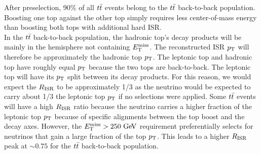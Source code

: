 \indent  After preselection, 90\% of all $t\bar{t}$ events belong to the $t\bar{t}$ back-to-back population.  Boosting one top against the other top simply requires less center-of-mass energy than boosting both tops with additional hard ISR.  \\

\indent In the $t\bar{t}$ back-to-back population, the hadronic top's decay products will be mainly in the hemisphere not containing $E_{\mathrm{T}}^{\mathrm{miss}}$.  The reconstructed ISR $p_{\mathrm{T}}$ will therefore be approximately the hadronic top $p_{\mathrm{T}}$.  The leptonic top and hadronic top have roughly equal $p_{\mathrm{T}}$ because the two tops are back-to-back.  The leptonic top will have its $p_{\mathrm{T}}$ split between its decay products.  For this reason, we would expect the $R_{\mathrm{ISR}}$ to be approximately 1/3 as the neutrino would be expected to carry about 1/3 the leptonic top $p_{\mathrm{T}}$ if no selections were applied. Some $t\bar{t}$ events will have a high $R_{\mathrm{ISR}}$ ratio because the neutrino carries a higher fraction of the leptonic top $p_{\mathrm{T}}$ because of specific alignments between the top boost and the decay axes. However, the $\met > 250 \gev$ requirement preferentially selects for neutrinos that gain a large fraction of the top $p_{\mathrm{T}}$.  This leads to a higher $R_{\mathrm{ISR}}$ peak at $\sim0.75$ for the $t\bar{t}$ back-to-back population. \\






